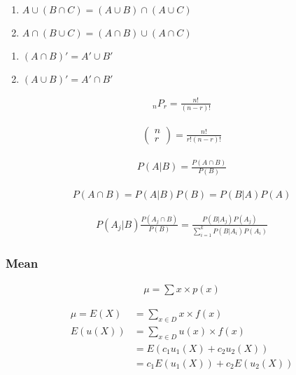 \documentclass{article}
\begin{document}
\begin{multicols*}{2}

\begin{enumerate}
    \item $A \cup (B \cap C) = (A \cup B) \cap (A \cup C)$
    \item $A \cap (B \cup C) = (A \cap B) \cup (A \cap C)$
\end{enumerate}

\begin{enumerate}
    \item $(A \cap B)' = A' \cup B'$
    \item $(A \cup B)' = A' \cap B'$
\end{enumerate}

\begin{align*}
    {}_n P_r = \frac{n!}{(n-r)!}
\end{align*}

\begin{align*}
    \begin{pmatrix}
        n \\
        r
    \end{pmatrix} = \frac{n!}{r! (n-r)!}
\end{align*}

\begin{align*}
    P(A|B) = \frac{P(A \cap B)}{P(B)}
\end{align*}

\begin{align*}
    P(A \cap B) = P(A|B) P(B) = P(B|A) P(A)
\end{align*}

\begin{align*}
    P(A_j|B) \frac{P(A_j \cap B)}{P(B)} = \frac{P(B|A_j) P(A_j)}{\sum_{i = 1}^k P(B|A_i) P(A_i)}
\end{align*}

\subsubsection{Mean}
\begin{align*}
    \mu = \sum x \times p(x)
\end{align*}

\begin{align*}
    \mu = E(X) &= \sum_{x \in D} x \times f(x) \\
    E(u(X)) &= \sum_{x \in D} u(x) \times f(x) \\
    &= E(c_1 u_1(X) + c_2 u_2(X)) \\
    &= c_1 E(u_1(X)) + c_2 E(u_2(X))
\end{align*}


\end{multicols*}
\end{document}
